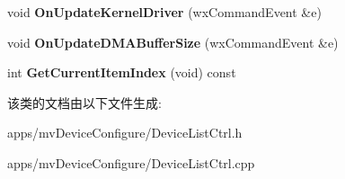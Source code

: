 \begin{DoxyCompactItemize}
\item 
\hypertarget{class_device_list_ctrl_ac76e14ffb993ca4ef9f44894c3cae409}{void {\bfseries On\+Update\+Kernel\+Driver} (wx\+Command\+Event \&e)}\label{class_device_list_ctrl_ac76e14ffb993ca4ef9f44894c3cae409}

\item 
\hypertarget{class_device_list_ctrl_a2c5f2fbd09579cb82b14217727cd2a13}{void {\bfseries On\+Update\+D\+M\+A\+Buffer\+Size} (wx\+Command\+Event \&e)}\label{class_device_list_ctrl_a2c5f2fbd09579cb82b14217727cd2a13}

\item 
\hypertarget{class_device_list_ctrl_a354e37022275266fb4118cc2307e7148}{int {\bfseries Get\+Current\+Item\+Index} (void) const }\label{class_device_list_ctrl_a354e37022275266fb4118cc2307e7148}

\end{DoxyCompactItemize}


该类的文档由以下文件生成\+:\begin{DoxyCompactItemize}
\item 
apps/mv\+Device\+Configure/Device\+List\+Ctrl.\+h\item 
apps/mv\+Device\+Configure/Device\+List\+Ctrl.\+cpp\end{DoxyCompactItemize}
